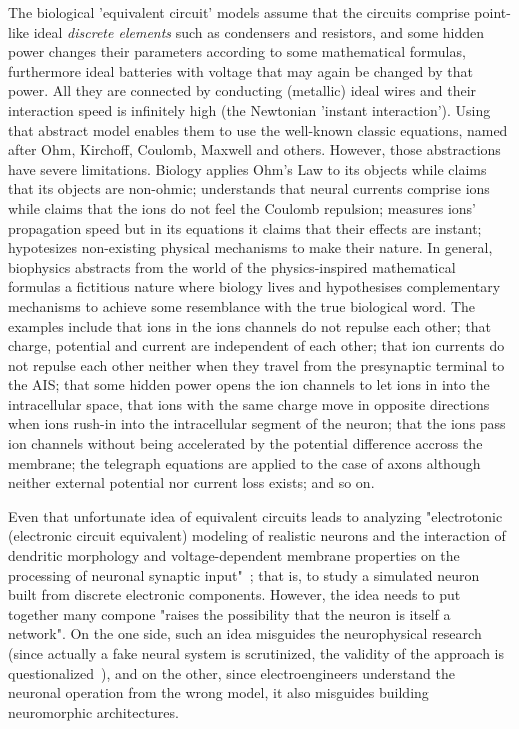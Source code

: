 \else

The biological 'equivalent circuit' models assume that the circuits comprise point-like
ideal \textit{discrete elements}
such as condensers and resistors, and some hidden power changes their parameters according to some
mathematical formulas,
furthermore ideal batteries with voltage that may again be changed  by that power.
All they are connected by conducting  (metallic) ideal wires
and their interaction speed is infinitely high (the Newtonian 'instant interaction').
Using that abstract model enables them to use the well-known classic equations, named after
Ohm, Kirchoff, Coulomb, Maxwell and others. However, those abstractions have severe limitations.
Biology applies Ohm's Law to its objects while claims that its objects are non-ohmic;
understands that neural currents comprise ions while claims that the ions do not feel the Coulomb repulsion;
measures ions' propagation speed but in its equations it claims that their effects are instant;
hypotesizes non-existing physical mechanisms to make their nature. In general,
biophysics abstracts from the world of the physics-inspired mathematical formulas a fictitious nature
where biology lives and hypothesises complementary mechanisms to achieve some resemblance with the true biological word.
The examples include that ions in the ions channels do not repulse each other;
that charge, potential and current are independent of each other;
that ion currents do not repulse each other neither when they travel from the presynaptic terminal to the
\gls{AIS};
that some hidden power opens the ion channels to let ions in into the intracellular space,
that ions with the same charge move in opposite directions when ions rush-in into the intracellular segment of the neuron;
that the ions pass ion channels without being accelerated by the potential difference accross the membrane;
the telegraph equations are applied to the case of axons although neither external potential nor current loss exists; and so on.


Even that unfortunate idea of equivalent circuits leads to analyzing
"electrotonic (electronic circuit equivalent) modeling of realistic neurons and the interaction of dendritic morphology
and voltage-dependent membrane properties on the processing of neuronal synaptic input"~\cite{SingleNeuronComputation:2014};
that is, to study a simulated neuron built from discrete electronic components. However, the idea needs to put together
many compone "raises the possibility that the neuron is itself a network". On the one side, such an idea misguides the neurophysical research (since actually a fake neural system is scrutinized, the validity of the approach is questionalized~\cite{RealisticNeuronalModeling:2016}), and on the other, since electroengineers understand
the neuronal operation from the wrong model, it also misguides building neuromorphic architectures. 
\fi

